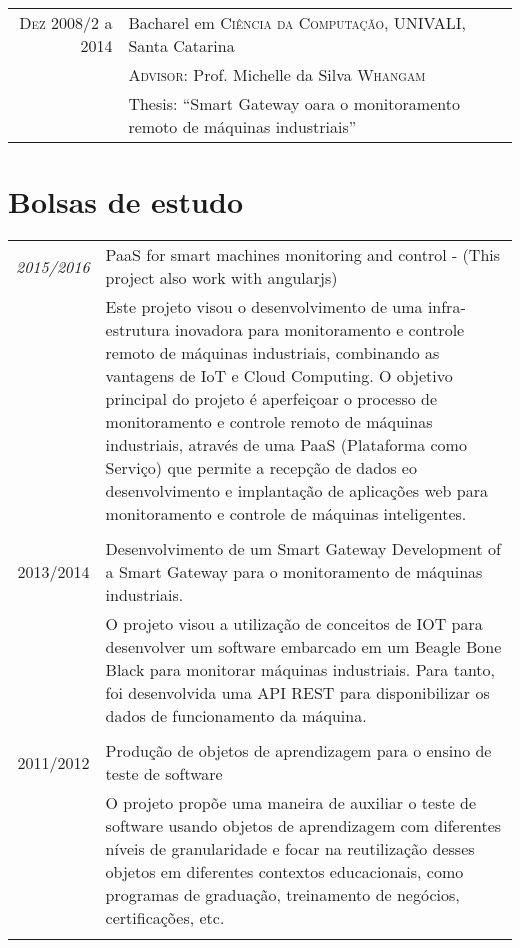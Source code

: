 \documentclass[a4paper,10pt]{article}
\begin{document}
\begin{tabular}{rl}	
\textsc{Dez} 2008/2 a 2014 & Bacharel em \textsc{Ciência da Computação}, UNIVALI, Santa Catarina\\
&\normalsize \textsc{Advisor}: Prof. Michelle da Silva \textsc{Whangam}\\
& Thesis: ``Smart Gateway oara o monitoramento remoto de máquinas industriais''
\end{tabular}

\section{Bolsas de estudo}
\begin{tabular}{r|p{11cm}}

\emph{2015/2016} & PaaS for smart machines monitoring and control - (This project also work with angularjs)\\
&\footnotesize{Este projeto visou o desenvolvimento de uma infra-estrutura inovadora para monitoramento e controle remoto de máquinas industriais, combinando as vantagens de IoT e Cloud Computing. O objetivo principal do projeto é aperfeiçoar o processo de monitoramento e controle remoto de máquinas industriais, através de uma PaaS (Plataforma como Serviço) que permite a recepção de dados eo desenvolvimento e implantação de aplicações web para monitoramento e controle de máquinas inteligentes.} \\\multicolumn{2}{c}{} \\

\textsc{2013/2014} & Desenvolvimento de um Smart Gateway Development of a Smart Gateway para o monitoramento de máquinas industriais.\\
&\footnotesize{O projeto visou a utilização de conceitos de IOT para desenvolver um software embarcado em um Beagle Bone Black para monitorar máquinas industriais. Para tanto, foi desenvolvida uma API REST para disponibilizar os dados de funcionamento da máquina.}\\\multicolumn{2}{c}{} \\

\textsc{2011/2012} & Produção de objetos de aprendizagem para o ensino de teste de software\\
&\footnotesize{O projeto propõe uma maneira de auxiliar o teste de software usando objetos de aprendizagem com diferentes níveis de granularidade e focar na reutilização desses objetos em diferentes contextos educacionais, como programas de graduação, treinamento de negócios, certificações, etc.}\\\multicolumn{2}{c}{} \\

\end{tabular}
\end{document}
